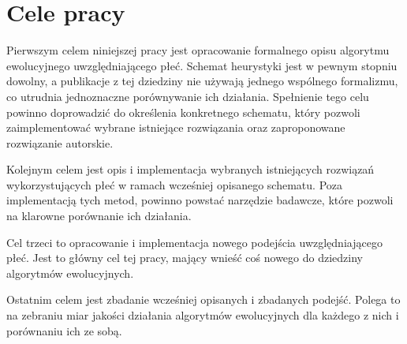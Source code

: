 \documentclass[./FM_mgr.tex]{subfiles}
\begin{document}
\section{Cele pracy}

Pierwszym celem niniejszej pracy jest opracowanie formalnego opisu algorytmu ewolucyjnego uwzględniającego płeć.
Schemat heurystyki jest w pewnym stopniu dowolny, a publikacje z tej dziedziny nie używają jednego wspólnego formalizmu, co utrudnia jednoznaczne porównywanie ich działania.
Spełnienie tego celu powinno doprowadzić do określenia konkretnego schematu, który pozwoli zaimplementować wybrane istniejące rozwiązania oraz zaproponowane rozwiązanie autorskie.

Kolejnym celem jest opis i implementacja wybranych istniejących rozwiązań wykorzystujących płeć w ramach wcześniej opisanego schematu.
Poza implementacją tych metod, powinno powstać narzędzie badawcze, które pozwoli na klarowne porównanie ich działania.

Cel trzeci to opracowanie i implementacja nowego podejścia uwzględniającego płeć.
Jest to główny cel tej pracy, mający wnieść coś nowego do dziedziny algorytmów ewolucyjnych.

Ostatnim celem jest zbadanie wcześniej opisanych i zbadanych podejść.
Polega to na zebraniu miar jakości działania algorytmów ewolucyjnych dla każdego z nich i porównaniu ich ze sobą.
\end{document}
